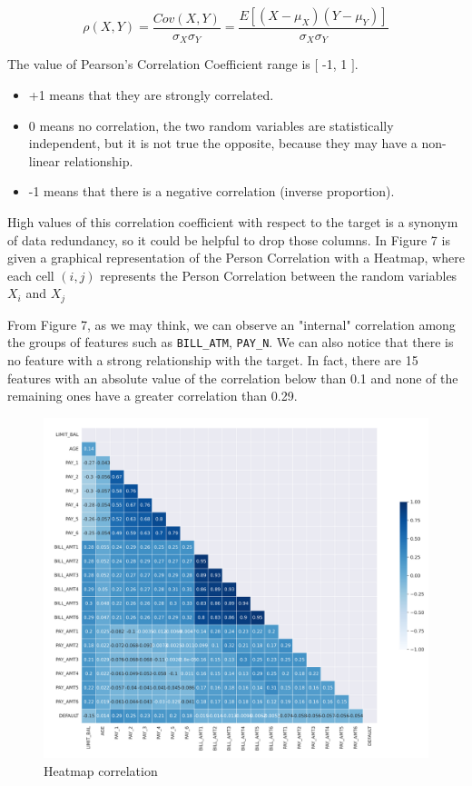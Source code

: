 \documentclass{article}
\begin{document}
\begin{equation}
\rho(X, Y ) =\frac{Cov(X, Y)}{\sigma_{X} \sigma_{Y}} = \frac{E[(X-\mu_{X})(Y-\mu_{Y})]}{\sigma_{X} \sigma_{Y}}
\end{equation}

The value of Pearson’s Correlation Coefficient range is $[$ -1, 1 $]$.
\begin{itemize}
    \item +1 means that they are strongly correlated.
    \item 0 means no correlation, the two random variables are statistically independent, but it is not true the opposite, because they may have a non-linear relationship.
    \item -1 means that there is a negative correlation (inverse proportion).
\end{itemize} 

High values of this correlation coefficient with respect to the target is a synonym of data redundancy, so it could be helpful to drop those columns. In Figure 7 is given a graphical representation of the Person Correlation with a Heatmap, where each cell $(i, j)$ represents the Person Correlation between the random variables $X_{i}$ and $X_{j}$

From Figure 7, as we may think, we can observe an "internal" correlation among the groups of features such as \texttt{BILL\_ATM}, \texttt{PAY\_N}. We can also notice that there is no feature with a strong relationship with the target. In fact, there are 15 features with an absolute value of the correlation below than 0.1 and none of the remaining ones have a greater correlation than 0.29.

\begin{figure}[H]
\centering
\includegraphics[width=1.1\textwidth]{correlation.png}
\caption{Heatmap correlation}
\end{figure}
\end{document}
